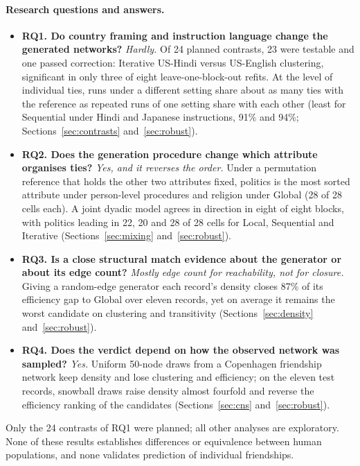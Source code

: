 \documentclass{article}
\begin{document}
\paragraph{Research questions and answers.}
\begin{itemize}
\setlength{\itemsep}{1pt}
\item \textbf{RQ1. Do country framing and instruction language change the generated networks?} \emph{Hardly.} Of 24 planned contrasts, 23 were testable and one passed correction: Iterative US-Hindi versus US-English clustering, significant in only three of eight leave-one-block-out refits. At the level of individual ties, runs under a different setting share about as many ties with the reference as repeated runs of one setting share with each other (least for Sequential under Hindi and Japanese instructions, 91\% and 94\%; Sections~\ref{sec:contrasts} and~\ref{sec:robust}).
\item \textbf{RQ2. Does the generation procedure change which attribute organises ties?} \emph{Yes, and it reverses the order.} Under a permutation reference that holds the other two attributes fixed, politics is the most sorted attribute under person-level procedures and religion under Global (28 of 28 cells each). A joint dyadic model agrees in direction in eight of eight blocks, with politics leading in 22, 20 and 28 of 28 cells for Local, Sequential and Iterative (Sections~\ref{sec:mixing} and~\ref{sec:robust}).
\item \textbf{RQ3. Is a close structural match evidence about the generator or about its edge count?} \emph{Mostly edge count for reachability, not for closure.} Giving a random-edge generator each record's density closes 87\% of its efficiency gap to Global over eleven records, yet on average it remains the worst candidate on clustering and transitivity (Sections~\ref{sec:density} and~\ref{sec:robust}).
\item \textbf{RQ4. Does the verdict depend on how the observed network was sampled?} \emph{Yes.} Uniform 50-node draws from a Copenhagen friendship network keep density and lose clustering and efficiency; on the eleven test records, snowball draws raise density almost fourfold and reverse the efficiency ranking of the candidates (Sections~\ref{sec:cns} and~\ref{sec:robust}).
\end{itemize}
Only the 24 contrasts of RQ1 were planned; all other analyses are exploratory. None of these results establishes differences or equivalence between human populations, and none validates prediction of individual friendships.
\end{document}
